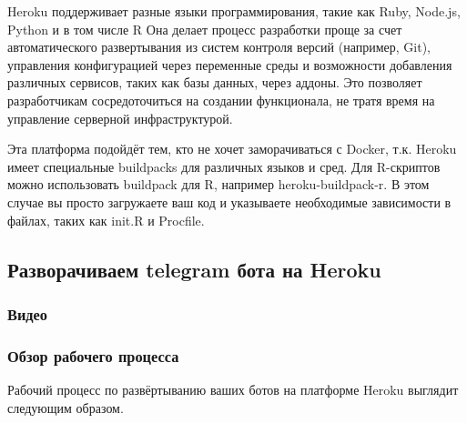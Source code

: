 \documentclass[
]{book}
\begin{document}
Heroku поддерживает разные языки программирования, такие как Ruby, Node.js, Python и в том числе R Она делает процесс разработки проще за счет автоматического развертывания из систем контроля версий (например, Git), управления конфигурацией через переменные среды и возможности добавления различных сервисов, таких как базы данных, через аддоны. Это позволяет разработчикам сосредоточиться на создании функционала, не тратя время на управление серверной инфраструктурой.

Эта платформа подойдёт тем, кто не хочет заморачиваться с Docker, т.к. Heroku имеет специальные buildpacks для различных языков и сред. Для R-скриптов можно использовать buildpack для R, например heroku-buildpack-r. В этом случае вы просто загружаете ваш код и указываете необходимые зависимости в файлах, таких как init.R и Procfile.

\subsection{Разворачиваем telegram бота на Heroku}\label{ux440ux430ux437ux432ux43eux440ux430ux447ux438ux432ux430ux435ux43c-telegram-ux431ux43eux442ux430-ux43dux430-heroku}

\subsubsection{Видео}\label{ux432ux438ux434ux435ux43e-2}

\subsubsection{Обзор рабочего процесса}\label{ux43eux431ux437ux43eux440-ux440ux430ux431ux43eux447ux435ux433ux43e-ux43fux440ux43eux446ux435ux441ux441ux430-2}

Рабочий процесс по развёртыванию ваших ботов на платформе Heroku выглядит следующим образом.
\end{document}
